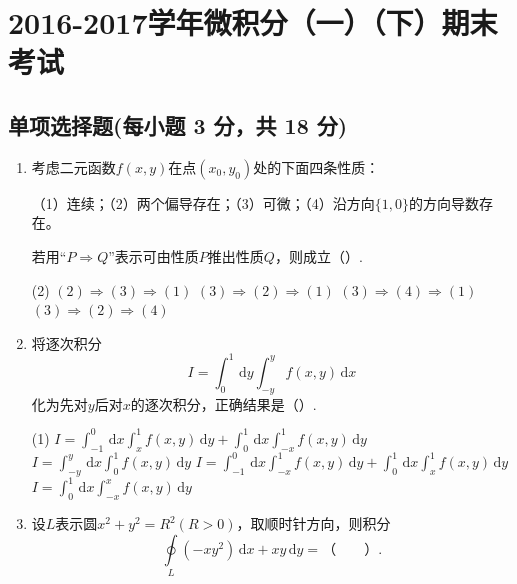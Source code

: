\documentclass[../Main.tex]{subfiles}
\begin{document}
\chapter{2016-2017学年微积分（一）（下）期末考试}

\section{单项选择题(每小题 3 分，共 18 分)}
\begin{enumerate}
    \item 考虑二元函数$f(x,y)$在点$(x_{0},y_{0})$处的下面四条性质：

          （1）连续；（2）两个偏导存在；（3）可微；（4）沿方向$\{1,0\}$的方向导数存在。

          若用“$P\Rightarrow Q$”表示可由性质$P$推出性质$Q$，则成立（\qquad）.

          \begin{tasks}[label=\textbf{\Alph*.}, label-width=1.5em, column-sep=1em](2)
              \task $(2)\Rightarrow(3)\Rightarrow(1)$
              \task $(3)\Rightarrow(2)\Rightarrow(1)$
              \task $(3)\Rightarrow(4)\Rightarrow(1)$
              \task $(3)\Rightarrow(2)\Rightarrow(4)$
          \end{tasks}
          \vspace{1em}

    \item 将逐次积分
          \[
              I=\int_{0}^{1}\,\mathrm{d}y\int_{-y}^{y}f(x,y)\,\mathrm{d}x
          \]
          化为先对$y$后对$x$的逐次积分，正确结果是（\qquad）.

          \begin{tasks}[label=\textbf{\Alph*.}, label-width=1.5em, column-sep=1em](1)
              \task $\displaystyle I=\int_{-1}^{0}\,\mathrm{d}x\int_{x}^{1}f(x,y)\,\mathrm{d}y+\int_{0}^{1}\,\mathrm{d}x\int_{-x}^{1}f(x,y)\,\mathrm{d}y$
              \task $\displaystyle I=\int_{-y}^{y}\,\mathrm{d}x\int_{0}^{1}f(x,y)\,\mathrm{d}y$
              \task $\displaystyle I=\int_{-1}^{0}\,\mathrm{d}x\int_{-x}^{1}f(x,y)\,\mathrm{d}y+\int_{0}^{1}\,\mathrm{d}x\int_{x}^{1}f(x,y)\,\mathrm{d}y$
              \task $\displaystyle I=\int_{0}^{1}\,\mathrm{d}x\int_{-x}^{x}f(x,y)\,\mathrm{d}y$
          \end{tasks}
          \vspace{1em}

    \item 设$L$表示圆$x^{2}+y^{2}=R^{2}(R>0)$，取顺时针方向，则积分
          \[
              \oint\limits_{L}(-xy^{2})\,\mathrm{d}x+xy\,\mathrm{d}y=（\qquad）.
          \]


\end{enumerate}
\end{document}
